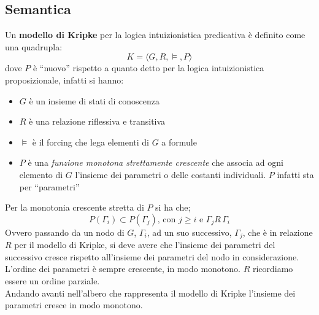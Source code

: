 \documentclass[a4paper,12pt, oneside]{book}
\begin{document}
\subsection{Semantica}
\begin{definizione}
  Un \textbf{modello di Kripke} per la logica intuizionistica predicativa è
  definito come una quadrupla:
  \[K=\langle G,R,\vDash, P\rangle\]
  dove $P$ è ``nuovo'' rispetto a quanto detto per la logica intuizionistica
  proposizionale, infatti si hanno:
  \begin{itemize}
    \item $G$ è un insieme di stati di conoscenza
    \item $R$ è una relazione riflessiva e transitiva
    \item $\vDash$ è il forcing che lega elementi di $G$ a formule
    \item $P$ è una \emph{funzione monotona strettamente crescente} che associa
    ad ogni elemento di $G$ l'insieme dei parametri o delle costanti
    individuali. $P$ infatti sta per ``parametri''
  \end{itemize}
  Per la monotonia crescente stretta di $P$ si ha che;
  \[P(\Gamma_i)\subset P(\Gamma_j)\mbox{, con }j\geq i\mbox{ e }
    \Gamma_jR\,\Gamma_i\]
  Ovvero passando da un nodo di $G$, $\Gamma_i$, ad un suo successivo,
  $\Gamma_j$, che è in relazione $R$ per il modello di Kripke, si deve avere che
  l'insieme dei parametri del successivo cresce rispetto all'insieme dei
  parametri del nodo in considerazione. L'ordine dei parametri è sempre
  crescente, in modo monotono. $R$ ricordiamo essere un ordine parziale. \\
  Andando avanti nell'albero che rappresenta il modello di Kripke l'insieme dei
  parametri cresce in modo monotono.
\end{definizione}
\end{document}
